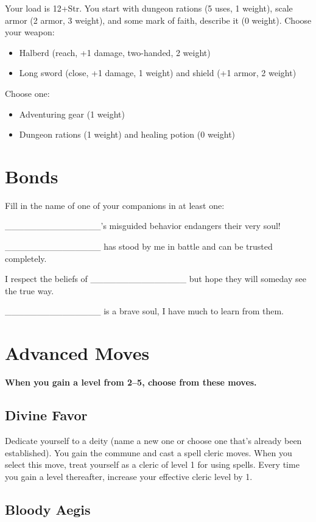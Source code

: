  Your load is 12+Str. You start with dungeon rations (5 uses, 1 weight), scale armor (2 armor, 3 weight), and some mark of faith, describe it (0 weight). Choose your weapon:
\begin{itemize}
\item Halberd (reach, +1 damage, two-handed, 2 weight)
\item Long sword (close, +1 damage, 1 weight) and shield (+1 armor, 2 weight)

\end{itemize}


 Choose one:
\begin{itemize}
\item Adventuring gear (1 weight)
\item Dungeon rations (1 weight) and healing potion (0 weight)

\end{itemize}
\section*{Bonds}


 Fill in the name of one of your companions in at least one:


 \_\_\_\_\_\_\_\_\_\_\_\_\_\_\_'s misguided behavior endangers their very soul!


 \_\_\_\_\_\_\_\_\_\_\_\_\_\_\_ has stood by me in battle and can be trusted completely.


 I respect the beliefs of \_\_\_\_\_\_\_\_\_\_\_\_\_\_\_ but hope they will someday see the true way.


 \_\_\_\_\_\_\_\_\_\_\_\_\_\_\_ is a brave soul, I have much to learn from them.
\section*{Advanced Moves}


 {\bfseries When you gain a level from 2--5, choose from these moves.}
\subsection{Divine Favor}


 Dedicate yourself to a deity (name a new one or choose one that's already been established). You gain the commune and cast a spell cleric moves. When you select this move, treat yourself as a cleric of level 1 for using spells. Every time you gain a level thereafter, increase your effective cleric level by 1.
\subsection{Bloody Aegis}


